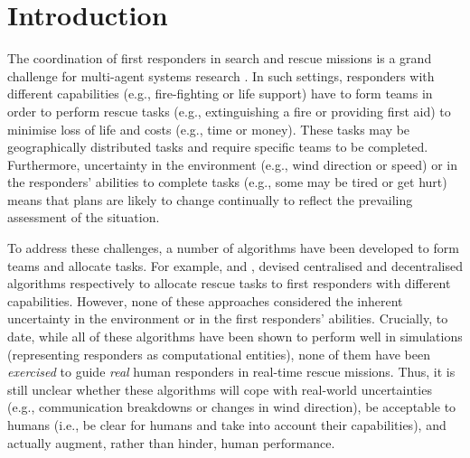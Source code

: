 \section{Introduction}
\noindent The coordination of first responders in search and rescue missions is a grand challenge for multi-agent systems research \cite{kitano:2001}. In such settings, responders with different capabilities (e.g., fire-fighting or life support) have to form teams in order to perform rescue tasks  (e.g., extinguishing a fire or providing first aid) to minimise  loss of life and costs (e.g., time or money). These tasks may be geographically distributed tasks and require specific teams  to be completed. Furthermore, uncertainty in the environment (e.g., wind direction or speed) or in the responders' abilities to complete tasks (e.g., some may be tired or get hurt) means that plans are likely to change continually to reflect the prevailing assessment of the situation. 

To address these challenges, a number of algorithms  have been developed to form teams and allocate tasks. For example, \cite{ramchurn:etal:2010,Scerri2005} and \cite{Chapman2009}, devised centralised and decentralised algorithms respectively to allocate rescue tasks to first responders with different capabilities. However, none of these approaches considered the inherent uncertainty in the environment or in the first responders' abilities. Crucially, to date, while all of these algorithms have been shown to perform well in simulations (representing responders as computational entities), none of them have been \emph{exercised} to guide \emph{real} human responders in real-time rescue missions. Thus, it is still unclear whether these algorithms will cope with real-world uncertainties (e.g., communication breakdowns or changes in wind direction), be acceptable to humans (i.e., be clear for humans and take into account their capabilities), and actually augment, rather than hinder,  human performance.


